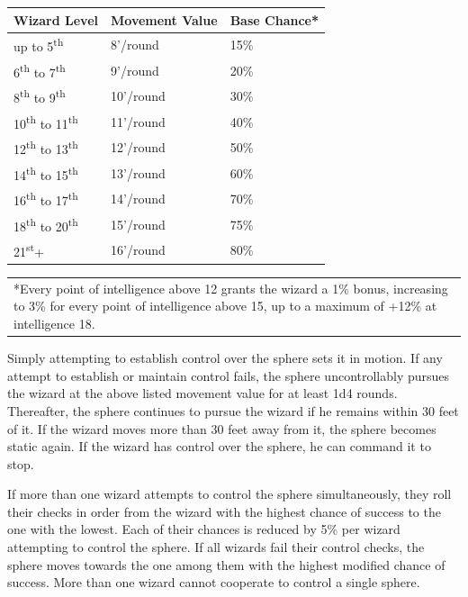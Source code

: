 \begin{multicols}{2}
\noindent\begin{minipage}{\columnwidth} 
\noindent \begin{tabular}{|p{}|p{}|p{}|}
\hline
Wizard Level	& Movement Value	& Base Chance* \\
\hline\hline
\rowcolor[gray]{.9}up to 5\textsuperscript{th}	& 8'/round	& 15\% \\
6\textsuperscript{th} to 7\textsuperscript{th}	& 9'/round	& 20\% \\
\rowcolor[gray]{.9}8\textsuperscript{th} to 9\textsuperscript{th}	& 10'/round	& 30\% \\
10\textsuperscript{th} to 11\textsuperscript{th}	& 11'/round	& 40\% \\
\rowcolor[gray]{.9}12\textsuperscript{th} to 13\textsuperscript{th}	& 12'/round	& 50\% \\
14\textsuperscript{th} to 15\textsuperscript{th}	& 13'/round	& 60\% \\
\rowcolor[gray]{.9}16\textsuperscript{th} to 17\textsuperscript{th}	& 14'/round	& 70\% \\
18\textsuperscript{th} to 20\textsuperscript{th}	& 15'/round	& 75\% \\
\rowcolor[gray]{.9}21\textsuperscript{st}+	& 16'/round	& 80\% \\
\hline
\end{tabular}
\noindent\begin{tabular}{p{}}
*Every point of intelligence above 12 grants the wizard a 1\% bonus, increasing to 3\% for every point of intelligence above 15, up to a maximum of +12\% at intelligence 18. \\
\end{tabular}\vspace{.5em}
\end{minipage}

Simply attempting to establish control over the sphere sets it in motion.  If any attempt to establish or maintain control fails, the sphere uncontrollably pursues the wizard at the above listed movement value for at least 1d4 rounds.  Thereafter, the sphere continues to pursue the wizard if he remains within 30 feet of it.  If the wizard moves more than 30 feet away from it, the sphere becomes static again.  If the wizard has control over the sphere, he can command it to stop. 

If more than one wizard attempts to control the sphere simultaneously, they roll their checks in order from the wizard with the highest chance of success to the one with the lowest.  Each of their chances is reduced by 5\% per wizard attempting to control the sphere.  If all wizards fail their control checks, the sphere moves towards the one among them with the highest modified chance of success.  More than one wizard cannot cooperate to control a single sphere.


\end{multicols}
